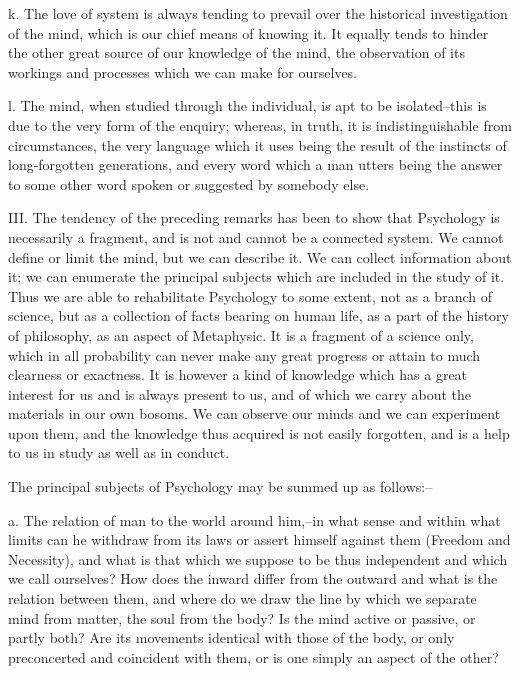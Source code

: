 k. The love of system is always tending to prevail over the historical
investigation of the mind, which is our chief means of knowing it. It
equally tends to hinder the other great source of our knowledge of the
mind, the observation of its workings and processes which we can make
for ourselves.

l. The mind, when studied through the individual, is apt to be
isolated--this is due to the very form of the enquiry; whereas, in
truth, it is indistinguishable from circumstances, the very language
which it uses being the result of the instincts of long-forgotten
generations, and every word which a man utters being the answer to some
other word spoken or suggested by somebody else.

III. The tendency of the preceding remarks has been to show that
Psychology is necessarily a fragment, and is not and cannot be a
connected system. We cannot define or limit the mind, but we can
describe it. We can collect information about it; we can enumerate the
principal subjects which are included in the study of it. Thus we are
able to rehabilitate Psychology to some extent, not as a branch of
science, but as a collection of facts bearing on human life, as a
part of the history of philosophy, as an aspect of Metaphysic. It is a
fragment of a science only, which in all probability can never make any
great progress or attain to much clearness or exactness. It is however
a kind of knowledge which has a great interest for us and is always
present to us, and of which we carry about the materials in our own
bosoms. We can observe our minds and we can experiment upon them, and
the knowledge thus acquired is not easily forgotten, and is a help to us
in study as well as in conduct.

The principal subjects of Psychology may be summed up as follows:--

a. The relation of man to the world around him,--in what sense and
within what limits can he withdraw from its laws or assert himself
against them (Freedom and Necessity), and what is that which we suppose
to be thus independent and which we call ourselves? How does the inward
differ from the outward and what is the relation between them, and where
do we draw the line by which we separate mind from matter, the soul
from the body? Is the mind active or passive, or partly both? Are its
movements identical with those of the body, or only preconcerted and
coincident with them, or is one simply an aspect of the other?

